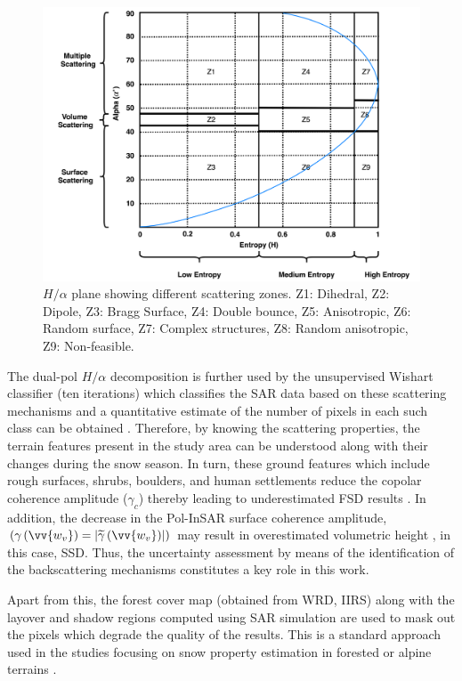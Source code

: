 \documentclass[review]{elsarticle}
\numberwithin{equation}{section}
\numberwithin{figure}{section}
\numberwithin{table}{section}
\begin{document}
\begin{figure}[htb]
    \centering
    \includegraphics[width=\textwidth]{Figures/Methods/HA.png}
    \caption{$H/{\alpha}$ plane showing different scattering zones. Z1: Dihedral, Z2: Dipole, Z3: Bragg Surface, Z4: Double
bounce, Z5: Anisotropic, Z6: Random surface, Z7: Complex structures, Z8: Random anisotropic, Z9: Non-feasible.}
    \label{fig:ha}
\end{figure}

The dual-pol $H/{\alpha}$ decomposition is further used by the unsupervised Wishart classifier (ten iterations) which classifies the SAR data based on these scattering mechanisms and a quantitative estimate of the number of pixels in each such class can be obtained \citep{Cloude2010, Lee2009}. Therefore, by knowing the scattering properties, the terrain features present in the study area can be understood along with their changes during the snow season. In turn, these ground features which include rough surfaces, shrubs, boulders, and human settlements reduce the copolar coherence amplitude ($\gamma_c$) thereby leading to underestimated FSD results \citep{Leinss2014, Leinss2016}. In addition, the decrease in the Pol-InSAR surface coherence amplitude, $\left(\gamma\left(\vv{w_v}\right) = \left\lvert\widetilde{\gamma}\left(\vv{w_v}\right)\right\rvert\right)$ may result in overestimated volumetric height \citep{Cloude2010, Hajnsek2009, Kugler2015}, in this case, SSD. Thus, the uncertainty assessment by means of the identification of the backscattering mechanisms constitutes a key role in this work.

Apart from this, the forest cover map (obtained from WRD, IIRS) along with the layover and shadow regions computed using SAR simulation are used to mask out the pixels which degrade the quality of the results. This is a standard approach used in the studies focusing on snow property estimation in forested or alpine terrains \citep{Leinss2014, Leinss2016, Singh2017, Thakur2012, Usami2016}.
\end{document}
